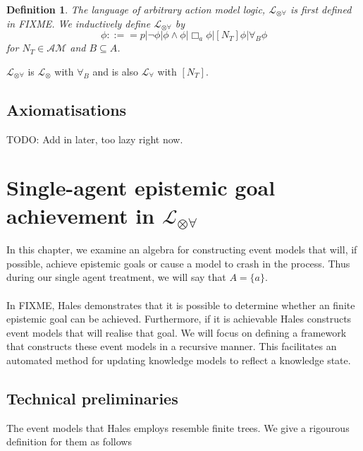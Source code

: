 \documentclass[12pt, a4paper, titlepage]{scrartcl}
\newtheorem{defn}{Definition}[section]
\numberwithin{equation}{section}
\newcommand{\sqex}[1]{[{#1}]}
\newcommand{\lang}{\mathcal{L}}
\newcommand{\langRefine}{\lang_{\forall}}
\newcommand{\langActEx}{\lang_{\otimes}}
\newcommand{\langArbAct}{\lang_{\otimes\forall}}
\newcommand{\eventClass}{\mathcal{AM}}
\begin{document}

\begin{defn} \label{arbActLogic}
The language of arbitrary action model logic, $\langArbAct$ is first defined in FIXME.
We inductively define $\langArbAct$ by
\[
	\phi ::== p | \neg \phi | \phi \land \phi | \Box_a \phi | \sqex{N_T} \phi | \forall_B \phi
\]
for $N_T \in \eventClass$ and $B \subseteq A$.
\end{defn}
$\langArbAct$ is $\langActEx$ with $\forall_B$ and is also $\langRefine$ with $\sqex{N_T}$.


\subsection{Axiomatisations}

TODO: Add in later, too lazy right now.

\section{Single-agent epistemic goal achievement in $\langArbAct$}

In this chapter, we examine an algebra for constructing event models that will, if possible, achieve
epistemic goals or cause a model to crash in the process.
Thus during our single agent treatment, we will say that $A = \{a\}$.\\
\\
In FIXME, Hales demonstrates that it is possible to determine whether an
finite epistemic goal can be achieved.
Furthermore, if it is achievable Hales constructs event models that will realise
that goal.
We will focus on defining a framework that constructs these event models in a
recursive manner.
This facilitates an automated method for updating knowledge models to reflect a
knowledge state.

\subsection{Technical preliminaries}

The event models that Hales employs resemble finite trees.
We give a rigourous definition for them as follows
\end{document}
